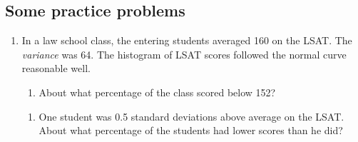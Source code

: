 \documentclass[
  letterpaper,
  DIV=11,
  numbers=noendperiod]{scrartcl}
\providecommand{\tightlist}{%
  \setlength{\itemsep}{0pt}\setlength{\parskip}{0pt}}
\begin{document}
\subsection{Some practice problems}\label{some-practice-problems}

\begin{enumerate}
\def\labelenumi{\arabic{enumi}.}
\item
  In a law school class, the entering students averaged 160 on the LSAT.
  The \emph{variance} was 64. The histogram of LSAT scores followed the
  normal curve reasonable well.

  \begin{enumerate}
  \def\labelenumii{\alph{enumii}.}
  \tightlist
  \item
    About what percentage of the class scored below 152?
  \end{enumerate}

  \vspace{3cm}

  \begin{enumerate}
  \def\labelenumii{\alph{enumii}.}
  \setcounter{enumii}{1}
  \tightlist
  \item
    One student was 0.5 standard deviations above average on the LSAT.
    About what percentage of the students had lower scores than he did?
  \end{enumerate}
\end{enumerate}

\clearpage
\end{document}
